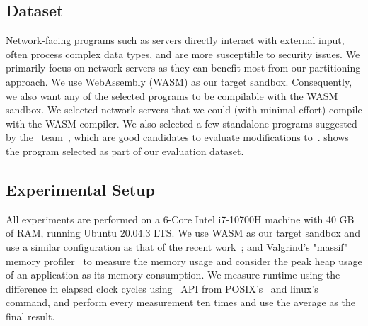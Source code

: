 \subsection{Dataset}

Network-facing programs such as servers directly interact with external input, often process complex data types, and are more susceptible to security issues.
We primarily focus on network servers as they can benefit most from our partitioning approach.
We use WebAssembly (WASM) as our target sandbox. Consequently, we also want any of the selected programs to be compilable with the WASM sandbox.
We selected network servers that we could (with minimal effort) compile with the WASM compiler.
We also selected a few standalone programs suggested by the ~\checkedc team~\cite{benchmarkcc}, which are good candidates to evaluate modifications to~\checkedc.
 shows the program selected as part of our evaluation dataset.


\subsection{Experimental Setup}
All experiments are performed on a 6-Core Intel i7-10700H machine with 40 GB of RAM, running Ubuntu 20.04.3 LTS.
We use WASM as our target sandbox and use a similar configuration as that of the recent work~\cite{rlbox-paper};
and Valgrind's "massif" memory profiler~\cite{seward2008valgrind} to measure the memory usage and consider the peak heap usage of an application as its memory consumption.
We measure runtime using the difference in elapsed clock cycles using~ API from POSIX's~ and linux's ~ command, and perform every measurement ten times and use the average as the final result.

